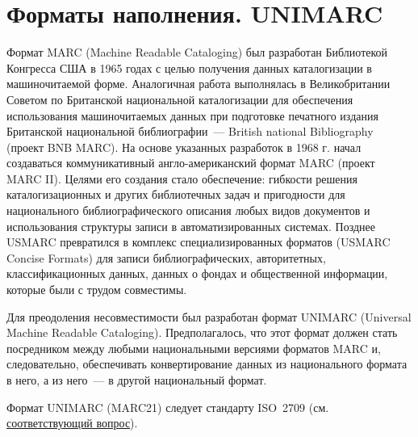 \documentclass[12pt]{article}
\theoremstyle{definition}
\theoremstyle{remark}
\numberwithin{equation}{section}
\begin{document}
\section{Форматы наполнения. UNIMARC}
Формат MARC (Machine Readable Cataloging) был разработан Библиотекой Конгресса США в 1965 годах с целью получения данных каталогизации в машиночитаемой форме. Аналогичная работа выполнялась в Великобритании Советом по Британской национальной каталогизации для обеспечения использования машиночитаемых данных при подготовке печатного издания Британской национальной библиографии~--- British national Bibliography (проект BNB MARC). На основе указанных разработок в 1968 г. начал создаваться коммуникативный англо\nobreakdash-американский формат MARC (проект MARC II). Целями его создания стало обеспечение: гибкости решения каталогизационных и других библиотечных задач и пригодности для национального библиографического описания любых видов документов и использования структуры записи в автоматизированных системах. Позднее USMARC превратился в комплекс специализированных форматов (USMARC Concise Formats) для записи библиографических, авторитетных, классификационных данных, данных о фондах и общественной информации, которые были с трудом совместимы.

Для преодоления несовместимости был разработан формат UNIMARC (Universal Machine Readable Cataloging). Предполагалось, что этот формат должен стать посредником между любыми национальными версиями форматов MARC и, следовательно, обеспечивать конвертирование данных из национального формата в него, а из него~--- в другой национальный формат.

Формат UNIMARC (MARC21) следует стандарту ISO~2709 (см. \hyperref[subsec:ISO]{соответствующий вопрос}).
\end{document}
